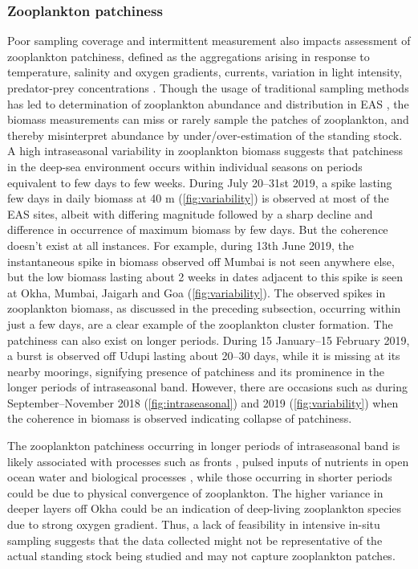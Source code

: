 \documentclass{article}
\begin{document}
    \subsubsection{Zooplankton patchiness}
    \label{sec:zooplanktonpatch}
    Poor sampling coverage and intermittent measurement also impacts assessment of zooplankton patchiness, defined as the aggregations arising in response to temperature, salinity and oxygen gradients, currents, variation in light intensity, predator-prey concentrations \citep{folt1999biological,raghukumar2003marine}. Though the usage of traditional sampling methods has led to determination of zooplankton abundance and distribution in EAS \citep{madhupratap1992zooplankton,madhupratap1996lack,khandagale2022seasonal}, the biomass measurements can miss or rarely sample the patches of zooplankton, and thereby misinterpret abundance by under/over-estimation of the standing stock. A high intraseasonal variability in zooplankton biomass suggests that patchiness in the deep-sea environment occurs within individual seasons on periods equivalent to few days to few weeks. During July 20--31st 2019, a spike lasting few days in daily biomass at 40 m (\cref{fig:variability}) is observed at most of the EAS sites, albeit with differing magnitude followed by a sharp decline and difference in occurrence of maximum biomass by few days. But the coherence doesn't exist at all instances. For example, during 13th June 2019, the instantaneous spike in biomass observed off Mumbai is not seen anywhere else, but the low biomass lasting about 2 weeks in dates adjacent to this spike is seen at  Okha, Mumbai, Jaigarh and Goa (\cref{fig:variability}). The observed spikes in zooplankton biomass, as discussed in the preceding subsection, occurring within just a few days, are a clear example of the zooplankton cluster formation. The patchiness can also exist on longer periods. During 15 January--15 February 2019, a burst is observed off Udupi lasting about 20--30 days, while it is missing at its nearby moorings, signifying presence of patchiness and its prominence in the longer periods of intraseasonal band. However, there are occasions such as during September--November 2018 (\cref{fig:intraseasonal}) and 2019 (\cref{fig:variability}) when the coherence in biomass is observed indicating collapse of patchiness.
    
    The zooplankton patchiness occurring in longer periods of intraseasonal band is likely associated with processes such as fronts \citep{coyle2000seasonal,wade2001acoustic,hitchcock2002zooplankton}, pulsed inputs of nutrients in open ocean water \citep{anil2021short} and biological processes \citep{folt1999biological}, while those occurring in shorter periods could be due to physical convergence \citep{napp1996plankton} of zooplankton. The higher variance in deeper layers off Okha could be an indication of deep-living zooplankton species \citep{raghukumar2003marine} due to strong oxygen gradient. Thus, a lack of feasibility in intensive in-situ sampling suggests that the data collected might not be representative of the actual standing stock being studied \citep{smith1998seasonal} and may not capture zooplankton patches.
    
\end{document}
